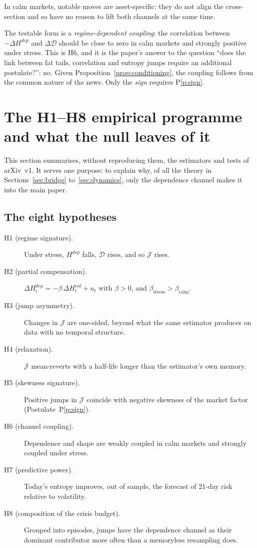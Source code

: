\documentclass[11pt]{article}
\theoremstyle{definition}
\theoremstyle{remark}
\newcommand{\JJ}{\mathcal{J}}
\newcommand{\DD}{\mathcal{D}}
\begin{document}
In calm markets, notable moves are asset-specific: they do not align the
cross-section and so have no reason to lift both channels at the same time.

The testable form is a \emph{regime-dependent coupling}: the correlation between
$-\Delta H^{dep}$ and $\Delta\DD$ should be close to zero in calm markets and
strongly positive under stress. This is H6, and it is the paper's answer to the
question ``does the link between fat tails, correlation and entropy jumps
require an additional postulate?'': no. Given
Proposition~\ref{prop:conditioning}, the coupling follows from the common nature
of the news. Only the \emph{sign} requires P\ref{p:sign}.

\section{The H1--H8 empirical programme and what the null leaves of it}
\label{sec:program}

This section summarises, without reproducing them, the estimators and tests of
arXiv~v1. It serves one purpose: to explain why, of all the theory in
Sections~\ref{sec:bridge} to~\ref{sec:dynamics}, only the dependence channel
makes it into the main paper.

\subsection{The eight hypotheses}

\begin{description}
\item[H1 (regime signature).] Under stress, $H^{dep}$ falls, $\DD$ rises, and so
$\JJ$ rises.
\item[H2 (partial compensation).] $\Delta H^{dep}_t=-\beta\,\Delta H^{vol}_t+u_t$
with $\beta>0$, and $\beta_{\text{stress}}>\beta_{\text{calm}}$.
\item[H3 (jump asymmetry).] Changes in $\JJ$ are one-sided, beyond what the same
estimator produces on data with no temporal structure.
\item[H4 (relaxation).] $\JJ$ mean-reverts with a half-life longer than the
estimator's own memory.
\item[H5 (skewness signature).] Positive jumps in $\JJ$ coincide with negative
skewness of the market factor (Postulate~P\ref{p:sign}).
\item[H6 (channel coupling).] Dependence and shape are weakly coupled in calm
markets and strongly coupled under stress.
\item[H7 (predictive power).] Today's entropy improves, out of sample, the
forecast of 21-day risk relative to volatility.
\item[H8 (composition of the crisis budget).] Grouped into episodes, jumps have
the dependence channel as their dominant contributor more often than a
memoryless resampling does.
\end{description}
\end{document}
